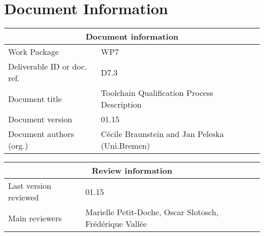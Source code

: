 \documentclass{template/openetcs_report}
\begin{document}
\newpage

\chapter{Document Information}

\begin{tabular}{|p{4.4cm}|p{8.7cm}|}
\hline
\multicolumn{2}{|c|}{Document information} \\
\hline
Work Package &  WP7  \\
Deliverable ID or doc. ref. & D7.3\\
\hline
Document title & Toolchain Qualification Process Description \\
Document version & 01.15 \\
Document authors (org.)  & Cécile Braunstein and Jan Peleska (Uni.Bremen) \\
\hline
\end{tabular}

\begin{tabular}{|p{4.4cm}|p{8.7cm}|}
\hline
\multicolumn{2}{|c|}{Review information} \\
\hline
Last version reviewed & 01.15 \\\hline
Main reviewers &  Marielle Petit-Doche, Oscar Slotosch, Frédérique Vallée\\
\hline
\end{tabular}
\end{document}
